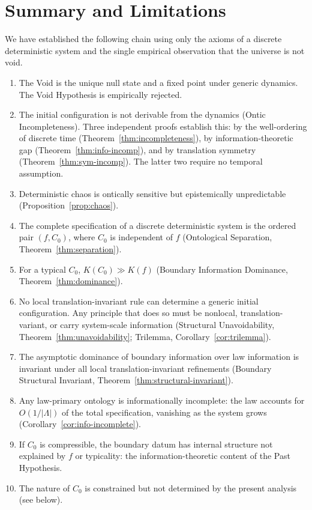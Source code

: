 \documentclass[12pt]{article}
\theoremstyle{plain}
\theoremstyle{definition}
\theoremstyle{remark}
\newcommand{\Lattice}{\Lambda}
\begin{document}
\section{Summary and Limitations}

We have established the following chain using only the axioms of a discrete deterministic system and the single empirical observation that the universe is not void.

\begin{enumerate}[label=(\roman*)]
\item The Void is the unique null state and a fixed point under generic dynamics. The Void Hypothesis is empirically rejected.
\item The initial configuration is not derivable from the dynamics (Ontic Incompleteness). Three independent proofs establish this: by the well-ordering of discrete time (Theorem~\ref{thm:incompleteness}), by information-theoretic gap (Theorem~\ref{thm:info-incomp}), and by translation symmetry (Theorem~\ref{thm:sym-incomp}). The latter two require no temporal assumption.
\item Deterministic chaos is ontically sensitive but epistemically unpredictable (Proposition~\ref{prop:chaos}).
\item The complete specification of a discrete deterministic system is the ordered pair $(f, C_0)$, where $C_0$ is independent of $f$ (Ontological Separation, Theorem~\ref{thm:separation}).
\item For a typical $C_0$, $K(C_0) \gg K(f)$ (Boundary Information Dominance, Theorem~\ref{thm:dominance}).
\item No local translation-invariant rule can determine a generic initial configuration. Any principle that does so must be nonlocal, translation-variant, or carry system-scale information (Structural Unavoidability, Theorem~\ref{thm:unavoidability}; Trilemma, Corollary~\ref{cor:trilemma}).
\item The asymptotic dominance of boundary information over law information is invariant under all local translation-invariant refinements (Boundary Structural Invariant, Theorem~\ref{thm:structural-invariant}).
\item Any law-primary ontology is informationally incomplete: the law accounts for $O(1/|\Lattice|)$ of the total specification, vanishing as the system grows (Corollary~\ref{cor:info-incomplete}).
\item If $C_0$ is compressible, the boundary datum has internal structure not explained by $f$ or typicality: the information-theoretic content of the Past Hypothesis.
\item The nature of $C_0$ is constrained but not determined by the present analysis (see below).
\end{enumerate}
\end{document}
